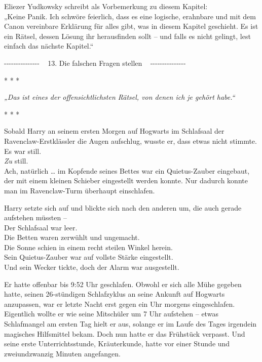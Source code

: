 

\hypertarget{die-falschen-fragen-stellen}{%

Eliezer Yudkowsky schreibt als Vorbemerkung zu diesem Kapitel:\\ „Keine Panik. Ich schwöre feierlich, dass es eine logische, erahnbare und mit dem Canon vereinbare Erklärung für alles gibt, was in diesem Kapitel geschieht. Es ist ein Rätsel, dessen Lösung ihr herausfinden sollt -- und falls es nicht gelingt, lest einfach das nächste Kapitel.“

-\/-\/-\/-\/-\/-\/-\/-\/-\/-\/-\/-\/-\/-\/- ~ 13. Die falschen Fragen stellen ~ -\/-\/-\/-\/-\/-\/-\/-\/-\/-\/-\/-\/-\/-\/-

* * *

\emph{„Das ist eines der offensichtlichsten Rätsel, von denen ich je gehört habe.“}

* * *

Sobald Harry an seinem ersten Morgen auf Hogwarts im Schlafsaal der Ravenclaw-Erstklässler die Augen aufschlug, wusste er, dass etwas nicht stimmte.\\ Es war still.\\ \emph{Zu} still.\\ Ach, natürlich … im Kopfende seines Bettes war ein Quietus-Zauber eingebaut, der mit einem kleinen Schieber eingestellt werden konnte. Nur dadurch konnte man im Ravenclaw-Turm überhaupt einschlafen.

Harry setzte sich auf und blickte sich nach den anderen um, die auch gerade aufstehen müssten --\\ Der Schlafsaal war leer.\\ Die Betten waren zerwühlt und ungemacht.\\ Die Sonne schien in einem recht steilen Winkel herein.\\ Sein Quietus-Zauber war auf vollste Stärke eingestellt.\\ Und sein Wecker tickte, doch der Alarm war ausgestellt.

Er hatte offenbar bis 9:52 Uhr geschlafen. Obwohl er sich alle Mühe gegeben hatte, seinen 26-stündigen Schlafzyklus an seine Ankunft auf Hogwarts anzupassen, war er letzte Nacht erst gegen ein Uhr morgens eingeschlafen. Eigentlich wollte er wie seine Mitschüler um 7 Uhr aufstehen -- etwas Schlafmangel am ersten Tag hielt er aus, solange er im Laufe des Tages irgendein magisches Hilfsmittel bekam. Doch nun hatte er das Frühstück verpasst. Und seine erste Unterrichtsstunde, Kräuterkunde, hatte vor einer Stunde und zweiundzwanzig Minuten angefangen.

}
